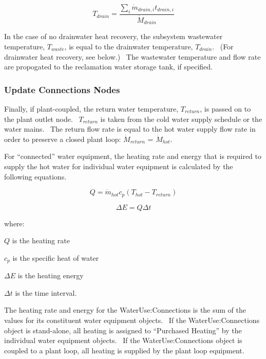 \begin{equation}
{T_{drain}} = \frac{{\mathop \sum \limits_i {{\dot m}_{drain,i}}{t_{drain,i}}}}{{{{\dot M}_{drain}}}}
\end{equation}

In the case of no drainwater heat recovery, the subsystem wastewater temperature, \({T_{waste}}\), is equal to the drainwater temperature, \({T_{drain}}\).~ (For drainwater heat recovery, see below.)~ The wastewater temperature and flow rate are propogated to the reclamation water storage tank, if specified.

\subsubsection{Update Connections Nodes}\label{update-connections-nodes}

Finally, if plant-coupled, the return water temperature, \({T_{return}}\), is passed on to the plant outlet node.~ \({T_{return}}\) is taken from the cold water supply schedule or the water mains.~ The return flow rate is equal to the hot water supply flow rate in order to preserve a closed plant loop: \({\dot M_{return}}\) = \({\dot M_{hot}}\).

For ``connected'' water equipment, the heating rate and energy that is required to supply the hot water for individual water equipment is calculated by the following equations.

\begin{equation}
Q = {\dot m_{hot}}{c_p}\left( {{T_{hot}} - {T_{return}}} \right)
\end{equation}

\begin{equation}
\Delta E = Q\Delta t
\end{equation}

where:

\(Q\) is the heating rate

\({c_p}\) is the specific heat of water

\(\Delta E\) is the heating energy

\(\Delta t\) is the time interval.

The heating rate and energy for the WaterUse:Connections is the sum of the values for its constituent water equipment objects.~ If the WaterUse:Connections object is stand-alone, all heating is assigned to ``Purchased Heating'' by the individual water equipment objects.~ If the WaterUse:Connections object is coupled to a plant loop, all heating is supplied by the plant loop equipment.

